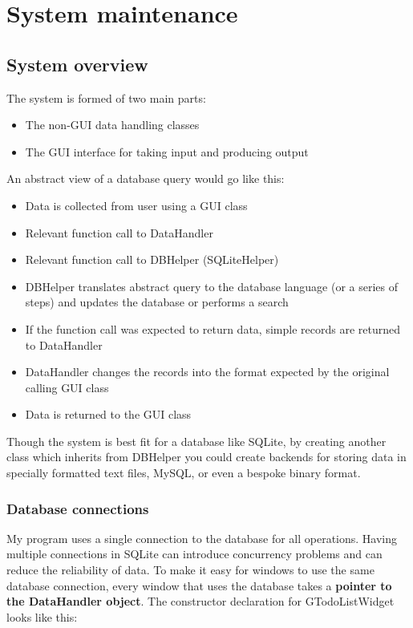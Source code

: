 \section{System maintenance}
\subsection{System overview}

The system is formed of two main parts:

\begin{itemize}
    \item The non-GUI data handling classes
    \item The GUI interface for taking input and producing output
\end{itemize}

An abstract view of a database query would go like this:

\begin{itemize}
    \item Data is collected from user using a GUI class
    \item Relevant function call to DataHandler
    \item Relevant function call to DBHelper (SQLiteHelper)
    \item DBHelper translates abstract query to the database language (or
        a series of steps) and updates the database or performs a search
    \item If the function call was expected to return data, simple records are
        returned to DataHandler
    \item DataHandler changes the records into the format expected by the
        original calling GUI class
    \item Data is returned to the GUI class
\end{itemize}

Though the system is best fit for a database like SQLite, by creating another
class which inherits from DBHelper you could create backends for storing data in
specially formatted text files, MySQL, or even a bespoke binary format.


\subsubsection{Database connections}

My program uses a single connection to the database for all operations. Having
multiple connections in SQLite can introduce concurrency problems and can
reduce the reliability of data. To make it easy for windows to use the same
database connection, every window that uses the database takes a \textbf{pointer
to the DataHandler object}. The constructor declaration for GTodoListWidget
looks like this:

